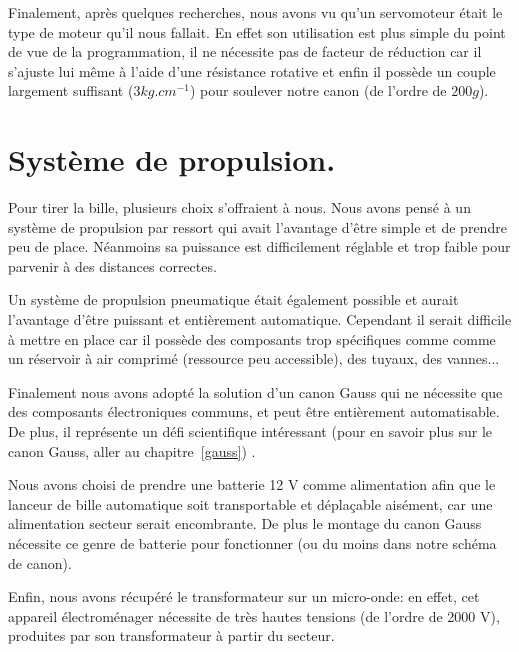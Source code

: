 Finalement, après quelques recherches, nous avons vu qu'un servomoteur était le type de moteur qu'il nous fallait. En effet son utilisation est plus simple du point de vue de la programmation, il  ne nécessite pas de facteur de réduction car il s'ajuste lui même à l'aide d'une résistance rotative et enfin il possède un couple largement suffisant ($3kg.cm^{-1}$) pour soulever notre canon (de l'ordre de $200g$).

\section{Système de propulsion.}
Pour tirer la bille, plusieurs choix s'offraient à nous. Nous avons pensé à un système de propulsion par ressort qui avait l'avantage d'être simple et de prendre peu de place. Néanmoins sa puissance est difficilement réglable et trop faible pour parvenir à des distances correctes. 

Un système de propulsion pneumatique était également possible et aurait l'avantage d'être puissant et entièrement automatique. Cependant il serait difficile à mettre en place car il possède des composants trop spécifiques  comme comme un réservoir à air comprimé (ressource peu accessible), des tuyaux, des vannes...

Finalement nous avons adopté la solution d'un canon Gauss qui ne nécessite   que  des composants électroniques communs, et peut être entièrement automatisable. De plus, il représente un défi scientifique intéressant (pour en savoir plus sur le canon Gauss, aller au chapitre~\ref{gauss}) .

Nous avons choisi de prendre une batterie 12 V comme alimentation afin que le lanceur de bille automatique soit transportable et déplaçable aisément, car une alimentation secteur serait encombrante. De plus le montage du canon Gauss nécessite ce genre de batterie pour fonctionner (ou du moins dans notre schéma de canon).

Enfin, nous avons récupéré  le transformateur sur un micro-onde: en effet, cet appareil électroménager nécessite de très hautes tensions (de l'ordre de 2000 V), produites par son transformateur à partir du secteur.
